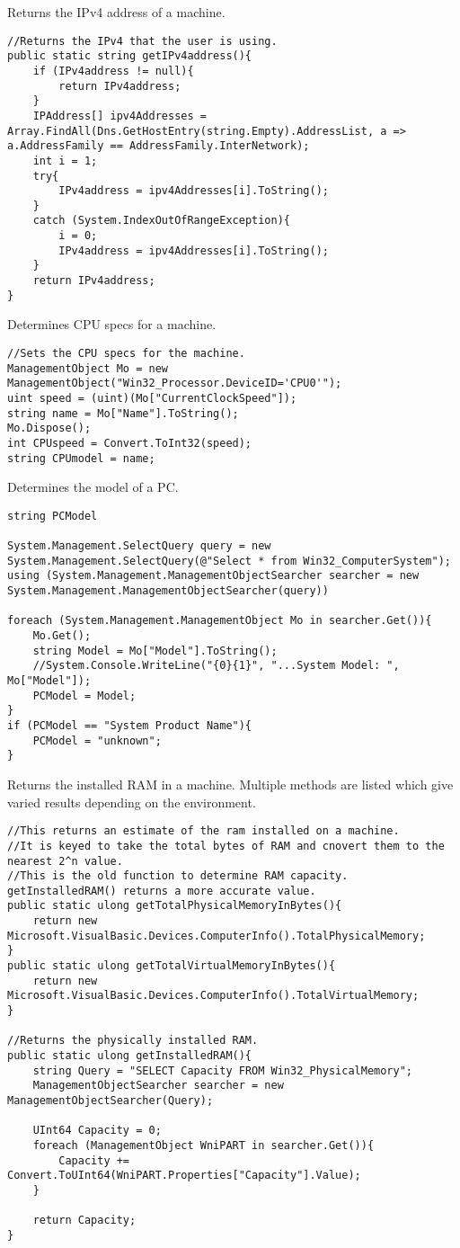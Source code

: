 Returns the IPv4 address of a machine.
\begin{lstlisting}
//Returns the IPv4 that the user is using.
public static string getIPv4address(){
	if (IPv4address != null){
		return IPv4address;
	}  
	IPAddress[] ipv4Addresses = Array.FindAll(Dns.GetHostEntry(string.Empty).AddressList, a => a.AddressFamily == AddressFamily.InterNetwork);
	int i = 1;
	try{                
		IPv4address = ipv4Addresses[i].ToString();
	}
	catch (System.IndexOutOfRangeException){
		i = 0;
		IPv4address = ipv4Addresses[i].ToString();
	}
	return IPv4address;
}

\end{lstlisting}

Determines CPU specs for a machine.
\begin{lstlisting}
//Sets the CPU specs for the machine.
ManagementObject Mo = new ManagementObject("Win32_Processor.DeviceID='CPU0'");
uint speed = (uint)(Mo["CurrentClockSpeed"]);
string name = Mo["Name"].ToString();
Mo.Dispose();
int CPUspeed = Convert.ToInt32(speed);
string CPUmodel = name;
\end{lstlisting}

Determines the model of a PC.
\begin{lstlisting}
string PCModel

System.Management.SelectQuery query = new System.Management.SelectQuery(@"Select * from Win32_ComputerSystem");
using (System.Management.ManagementObjectSearcher searcher = new System.Management.ManagementObjectSearcher(query))

foreach (System.Management.ManagementObject Mo in searcher.Get()){
	Mo.Get();
	string Model = Mo["Model"].ToString();
	//System.Console.WriteLine("{0}{1}", "...System Model: ", Mo["Model"]);
	PCModel = Model;
}
if (PCModel == "System Product Name"){
	PCModel = "unknown";
}
\end{lstlisting}

Returns the installed RAM in a machine. Multiple methods are listed which give varied results depending on the environment.
\begin{lstlisting}
//This returns an estimate of the ram installed on a machine. 
//It is keyed to take the total bytes of RAM and cnovert them to the nearest 2^n value.
//This is the old function to determine RAM capacity. getInstalledRAM() returns a more accurate value.
public static ulong getTotalPhysicalMemoryInBytes(){
	return new Microsoft.VisualBasic.Devices.ComputerInfo().TotalPhysicalMemory;
} 
public static ulong getTotalVirtualMemoryInBytes(){
	return new Microsoft.VisualBasic.Devices.ComputerInfo().TotalVirtualMemory;
}

//Returns the physically installed RAM.
public static ulong getInstalledRAM(){
	string Query = "SELECT Capacity FROM Win32_PhysicalMemory";
	ManagementObjectSearcher searcher = new ManagementObjectSearcher(Query);
	
	UInt64 Capacity = 0;
	foreach (ManagementObject WniPART in searcher.Get()){
		Capacity += Convert.ToUInt64(WniPART.Properties["Capacity"].Value);
	}
	
	return Capacity;
}
\end{lstlisting}


